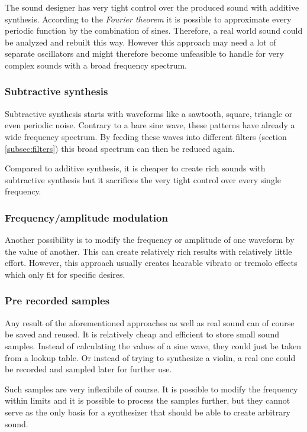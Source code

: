 				The sound designer has very tight control over the produced sound with additive synthesis.
				According to the \emph{Fourier theorem} it is possible to approximate every periodic function by the combination of sines. 
				Therefore, a real world sound could be analyzed and rebuilt this way.
				However this approach may need a lot of separate oscillators and might therefore become unfeasible to handle for very complex sounds with a broad frequency spectrum.
			\subsubsection{Subtractive synthesis}
				Subtractive synthesis starts with waveforms like a sawtooth, square, triangle or even periodic noise.
				Contrary to a bare sine wave, these patterns have already a wide frequency spectrum. 
				By feeding these waves into different filters (section \ref{subsec:filters}) this broad spectrum can then be reduced again. 
				
				Compared to additive synthesis, it is cheaper to create rich sounds with subtractive synthesis but it sacrifices the very tight control over every single frequency.
			\subsubsection{Frequency/amplitude modulation}
				Another possibility is to modify the frequency or amplitude of one waveform by the value of another.
				This can create relatively rich results with relatively little effort.
				However, this approach usually creates hearable vibrato or tremolo effects which only fit for specific desires.
			\subsubsection{Pre recorded samples}
				Any result of the aforementioned approaches as well as real sound can of course be saved and reused.
				It is relatively cheap and efficient to store small sound samples. 
				Instead of calculating the values of a sine wave, they could just be taken from a lookup table.
				Or instead of trying to synthesize a violin, a real one could be recorded and sampled later for further use.
				
				Such samples are very inflexibile of course.
				It is possible to modify the frequency within limits and it is possible to	process the samples further, but they cannot serve as the only basis for a synthesizer that should be able to create arbitrary sound.			

